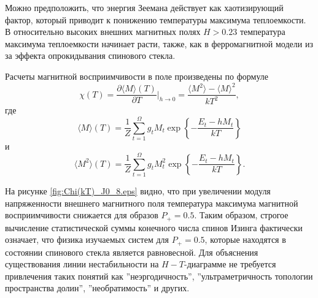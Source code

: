 Можно предположить, что энергия Зеемана действует как хаотизирующий фактор, который приводит к понижению температуры максимума теплоемкости. В относительно высоких внешних магнитных полях $H>0.23$ температура максимума теплоемкости начинает расти, также, как в ферромагнитной модели из за эффекта опрокидывания спинового стекла.

Расчеты магнитной восприимчивости в поле произведены по формуле 
\begin{equation}
	\chi(T)=\frac{\partial \langle M \rangle (T)}{\partial T}\bigg|_{h\rightarrow 0}=\frac{\langle M^2 \rangle-\langle M \rangle ^2}{k T^2},
	\label{eq:ct}
\end{equation}
где
\begin{equation}
	\langle M \rangle (T) =\frac{1}{Z}\sum_{t=1}^{\Omega}g_t M_t \exp\left\{-\frac{E_t-h M_t}{kT}\right\}
	\label{eq:ct}
\end{equation}
и
\begin{equation}
	\langle M^2 \rangle (T) =\frac{1}{Z}\sum_{t=1}^{\Omega}g_t M_t^2 \exp\left\{-\frac{E_t-h M_t}{kT}\right\}.
	\label{eq:ct}
\end{equation}


На рисунке \ref{fig:Chi(kT)_J0_8.eps} видно, что при увеличении модуля напряженности внешнего магнитного поля температура максимума магнитной восприимчивости снижается для образов $P_+=0.5$. Таким образом, строгое вычисление статистической суммы   конечного числа спинов Изинга фактически означает, что физика изучаемых систем для $P_+=0.5$, которые находятся в состоянии спинового стекла является равновесной. Для объяснения существования линии нестабильности на $H-T$-диаграмме не требуется привлечения таких понятий как ''неэргодичность'', ''ультраметричность топологии пространства долин'', ''необратимость'' и других.